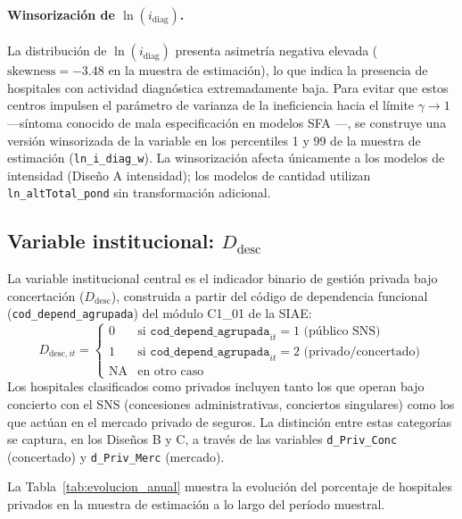 \paragraph{Winsorización de $\ln(i_{\text{diag}})$.}
La distribución de $\ln(i_{\text{diag}})$ presenta asimetría negativa elevada (\(\text{skewness} = -3.48\) en la muestra de estimación), lo que indica la presencia de hospitales con actividad diagnóstica extremadamente baja. Para evitar que estos centros impulsen el parámetro de varianza de la ineficiencia hacia el límite \(\gamma \to 1\) —síntoma conocido de mala especificación en modelos SFA \citep{kumbhakar2000stochastic}—, se construye una versión winsorizada de la variable en los percentiles 1 y 99 de la muestra de estimación (\texttt{ln\_i\_diag\_w}). La winsorización afecta únicamente a los modelos de intensidad (Diseño A intensidad); los modelos de cantidad utilizan \texttt{ln\_altTotal\_pond} sin transformación adicional.

\subsection{Variable institucional: $D_{\text{desc}}$}
\label{subsec:Ddesc}

La variable institucional central es el indicador binario de gestión privada bajo concertación (\(D_{\text{desc}}\)), construida a partir del código de dependencia funcional (\texttt{cod\_depend\_agrupada}) del módulo C1\_01 de la SIAE:
%
\[
  D_{\text{desc},it} =
  \begin{cases}
    0 & \text{si } \texttt{cod\_depend\_agrupada}_{it} = 1 \text{ (público SNS)} \\
    1 & \text{si } \texttt{cod\_depend\_agrupada}_{it} = 2 \text{ (privado/concertado)} \\
    \text{NA} & \text{en otro caso}
  \end{cases}
\]
%
Los hospitales clasificados como privados incluyen tanto los que operan bajo concierto con el SNS (concesiones administrativas, conciertos singulares) como los que actúan en el mercado privado de seguros. La distinción entre estas categorías se captura, en los Diseños B y C, a través de las variables \texttt{d\_Priv\_Conc} (concertado) y \texttt{d\_Priv\_Merc} (mercado).

La Tabla~\ref{tab:evolucion_anual} muestra la evolución del porcentaje de hospitales privados en la muestra de estimación a lo largo del período muestral.

\begin{table}[htbp]
\centering
\caption{Evolución anual de la muestra de estimación (Diseño A)}
\label{tab:evolucion_anual}
\small

\end{table}

